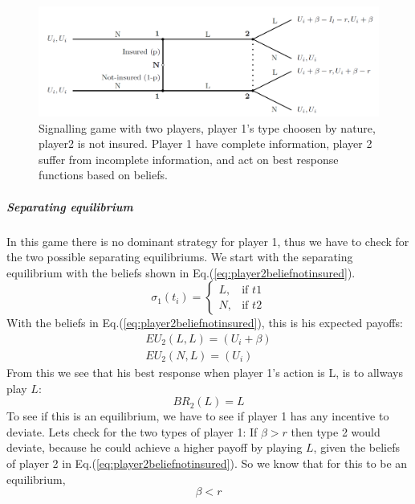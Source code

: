 \begin{figure}[h]
\centering

  \centering
\includegraphics[width=1\linewidth]{../Figures/SignalingGameNotInsured.png}

\caption{Signalling game with two players, player 1's type choosen by nature, player2 is not insured. Player 1 have complete information, player 2 suffer from incomplete information, and act on best response functions based on beliefs. \label{fig:signalingNotInsured}}

\end{figure}
\subparagraph{Separating equilibrium}
In this game there is no dominant strategy for player 1, thus we have to check for the two possible separating equilibriums.
We start with the separating equilibrium with the beliefs shown in Eq.(\ref{eq:player2beliefnotinsured}).
\begin{equation}
    \sigma_{1}(t_{i})= 
\begin{cases}
   L,& \text{if } t1\\
   N,& \text{if } t2  
\end{cases}
\label{eq:player2beliefnotinsured}
\end{equation}
With the beliefs in Eq.(\ref{eq:player2beliefnotinsured}), this is his expected payoffs:
\begin{eqnarray}
EU_{2}(L,L)=(U_{i}+\beta) \\
EU_{2}(N,L)=(U_{i})
\end{eqnarray}
From this we see that his best response when player 1's action is L, is to allways play $L$: \begin{equation}
BR_{2}(L)= L
\end{equation}
To see if this is an equilibrium, we have to see if player 1 has any incentive to deviate. 
Lets check for the two types of player 1:
If $\beta>r$ then type 2 would deviate, because he could achieve a higher payoff by playing $L$, given the beliefs of player 2 in Eq.(\ref{eq:player2beliefnotinsured}). So we know that for this to be an equilibrium, \begin{equation}
\beta < r
\label{eq:sepcondition}
\end{equation}  
